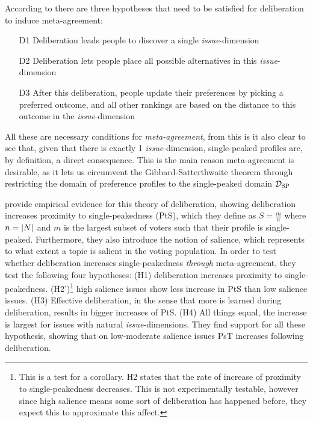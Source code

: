 According to \citet{listTwoConceptsAgreement2002} there are three hypotheses that need to be satisfied for deliberation to induce meta-agreement:
\begin{enumerate}
	\label{list:meta-agreement-checklist}
	\setlength\itemsep{1px}
	\item [D1] Deliberation leads people to discover a single \emph{issue}-dimension
	\item [D2] Deliberation lets people place all possible alternatives in this \emph{issue}-dimension
	\item [D3] After this deliberation, people update their preferences by picking
	      a preferred outcome, and all other rankings are based on the distance to this outcome in the \emph{issue}-dimension
\end{enumerate}

All these are necessary conditions for \emph{meta-agreement}, from this is it
also clear to see that, given that there is exactly 1 \emph{issue}-dimension,
single-peaked profiles are, by definition, a direct consequence. This is the
main reason meta-agreement is desirable, as it lets us circumvent the
Gibbard-Satterthwaite theorem \citep{gibbardManipulationVotingSchemes1973,
satterthwaiteStrategyproofnessArrowsConditions1975} through restricting the
domain of preference profiles to the single-peaked domain $\mathcal{D}_{\textnormal{SP}}$


\citet{listDeliberationSinglePeakednessPossibility2013} provide empirical
evidence for this theory of deliberation, showing deliberation increases
proximity to single-peakedness (PtS), which they define as $S= \frac{m}{n}$
where $n = |N|$ and $m$ is the largest subset of voters such that their
profile is single-peaked. Furthermore, they also introduce the notion of
salience, which represents to what extent a topic is salient in the voting
population. In order to test whether deliberation increases single-peakedness
\emph{through} meta-agreement, they test the following four hypotheses: (H1)
deliberation increases proximity to single-peakedness. (H2')\footnote{This is a
test for a corollary. H2 states that the rate of increase of proximity to
single-peakedness decreases. This is not experimentally testable, however since
high salience means some sort of deliberation has happened before, they expect
this to approximate this affect.} high salience issues show less increase in
PtS than low salience issues. (H3) Effective deliberation, in the sense that
more is learned during deliberation, results in bigger increases of PtS. (H4)
All things equal, the increase is largest for issues with natural
\emph{issue}-dimensions. They find support for all these hypothesis, showing
that on low-moderate salience issues PsT increases following deliberation. 

